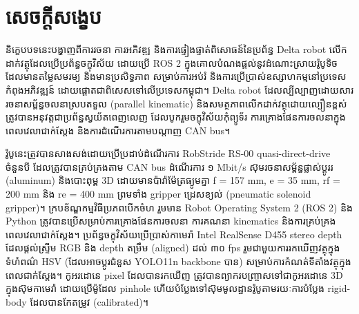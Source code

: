 \section*{\centering \KhOSml សេចក្តីសង្ខេប}
\vspace{2.5mm}
{\KhOS
\hspace{1.27cm}
និក្ខេបបទនេះបង្ហាញពីការរចនា ការអភិវឌ្ឍ និងការផ្ទៀងផ្ទាត់ពិសោធន៍នៃប្រព័ន្ធ Delta robot លើកដាក់វត្ថុដែលប្រើប្រព័ន្ធចក្ខុវិស័យ ដោយប្រើ ROS 2 ក្នុងគោលបំណងផ្តល់នូវដំណោះស្រាយរ៉ូបូទិចដែលមានតម្លៃសមរម្យ និងមានប្រសិទ្ធភាព សម្រាប់ការអប់រំ និងការប្រើប្រាស់ឧស្សាហកម្មនៅប្រទេសកំពុងអភិវឌ្ឍន៍ ដោយផ្តោតជាពិសេសទៅលើប្រទេសកម្ពុជា។ Delta robot ដែលល្បីល្បាញដោយសាររចនាសម្ព័ន្ធចលនាស្របតទួល (parallel kinematic) និងសមត្ថភាពលើកដាក់វត្ថុដោយល្បឿនខ្ពស់ ត្រូវបានអនុវត្តជាប្រព័ន្ធស្វយ័តពេញលេញ ដែលបូករួមចក្ខុវិស័យកុំព្យូទ័រ ការគ្រោងផែនការចលនាក្នុងពេលវេលាជាក់ស្តែង និងការដំណើរការតាមបណ្តាញ CAN bus។
    \par
    \hspace{1.27cm}
    រ៉ូបូនេះត្រូវបានសាងសង់ដោយប្រើប្រដាប់ដំណើរការ RobStride RS-00 quasi-direct-drive ចំនួនបី ដែលត្រូវបានគ្រប់គ្រងតាម CAN bus ដំណើរការ ១ Mbit/s ស៊ុមរចនាសម្ព័ន្ធផ្លាស់ប្ដូររ (aluminum) និងបោះពុម្ព 3D ដោយមានប៉ារ៉ាម៉ែត្រធ្យូមគ្នា f = 157 mm, e = 35 mm, rf = 200 mm និង re = 400 mm ព្រមទាំង gripper ដ្រេសខ្យល់ (pneumatic solenoid gripper)។ ក្របខ័ណ្ឌកម្មវិធីប្រភពបើកចំហ រួមមាន Robot Operating System 2 (ROS 2) និង Python ត្រូវបានប្រើសម្រាប់ការគ្រោងផែនការចលនា ការគណនា kinematics និងការគ្រប់គ្រងពេលវេលាជាក់ស្តែង។ ប្រព័ន្ធចក្ខុវិស័យប្រើប្រាស់កាមេរ៉ា Intel RealSense D455 stereo depth ដែលផ្តល់ស្ទ្រីម RGB និង depth តម្រឹម (aligned) ដល់ ៣០ fps រួមជាមួយការរកឃើញវត្ថុក្នុងទំហំពណ៌ HSV (ដែលអាចប្ដូរជំនួស YOLO11n backbone បាន) សម្រាប់ការកំណត់ទីតាំងវត្ថុក្នុងពេលជាក់ស្តែង។ កូអរដោនេ pixel ដែលបានរកឃើញ ត្រូវបានព្យាករបញ្ច្រាសទៅជាកូអរដោនេ 3D ក្នុងស៊ុមកាមេរ៉ា ដោយប្រើម៉ូដែល pinhole ហើយបំប្លែងទៅស៊ុមមូលដ្ឋានរ៉ូបូតាមរយៈការបំប្លែង rigid-body ដែលបានកែតម្រូវ (calibrated)។
    \par
    \hspace{1.27cm}
}
